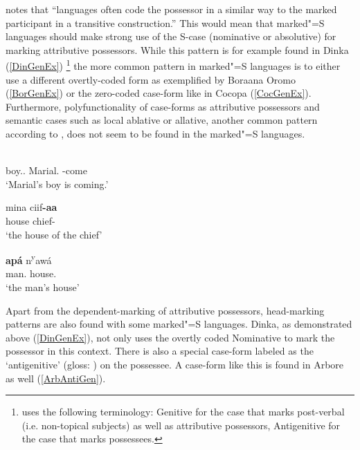 \citet[590]{Lander:2009} notes that ``languages often code the possessor in a similar way to the marked participant in a transitive construction.''
This would mean that marked"=S languages should make strong use of the S-case (nominative or ab\-so\-lu\-tive) for marking attributive possessors.
While this pattern is for example found in Dinka (\ref{DinGenEx})
\footnote{\citet{Andersen:1991} uses the following terminology: Genitive for the case that marks post-verbal (i.e. non-topical subjects) as well as attributive possessors, Antigenitive for the case that marks possessees.}
 the more common pattern in marked"=S languages is to either use a different overtly-coded form as exemplified by Boraana Oromo (\ref{BorGenEx}) or the zero-coded case-form like in Cocopa (\ref{CocGenEx}). 
Furthermore, polyfunctionality of case-forms as attributive possessors and semantic cases such as local ablative or allative, another common pattern according to \citet[590]{Lander:2009},  does not seem to be found in the marked"=S languages.  

\begin{exe} 
\ex\label{DinGenEx}
\gll{}  \textbf{} \\
boy.\antgen{}.\acc{} \partic{} Marial.\nom{} \decl{}-come\\
\glt `Marial's boy is coming.'
\end{exe}

\begin{exe}
\ex\label{BorGenEx}
\gll mina ciif\textbf{-aa}\\
house chief-\gen{}\\
\glt `the house of the chief'
\end{exe} 

\begin{exe}\ex\label{CocGenEx}
\gll\textbf{ap\'a} n\textsuperscript{y}aw\'a\\
man.\acc{} house.\acc{}\\
\glt `the man's house'
\end{exe}


Apart from the dependent-marking of attributive possessors, head-marking patterns are also found with some marked"=S languages.
Dinka, as demonstrated above (\ref{DinGenEx}), not only uses the overtly coded Nominative  to mark the possessor in this context. 
There is also a special case-form labeled as the `antigenitive' (gloss: \antgen{}) on the possessee. 
A case-form like this is found in Arbore as well (\ref{ArbAntiGen}).

